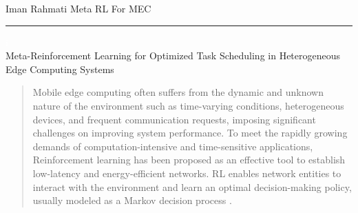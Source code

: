 \documentclass[12pt]{article}
\begin{document}
	

	
%




\begin{center} 
	
	
	\vspace{-17mm}
	
	\large Iman Rahmati  \hfill Meta RL For MEC \vspace{1mm} \hrule
	
	\vspace{-1mm}
	
	
	
	\textcolor{white}{i} \\ \LARGE Meta-Reinforcement Learning for Optimized Task Scheduling in Heterogeneous Edge Computing Systems \vspace{6mm}\\
	
\end{center}



\vspace{-8mm}

\begin{abstract}
	\vspace{-2mm}
	\noindent
	Mobile edge computing often suffers from the dynamic and unknown nature of the environment such as time-varying conditions, heterogeneous devices, and frequent communication requests, imposing significant challenges on improving system performance. To meet the rapidly growing demands of computation-intensive and time-sensitive applications, Reinforcement learning \cite{mnih2015human} has been proposed as an effective tool to establish low-latency and energy-efficient networks. RL enables network entities to interact with the environment and learn an optimal decision-making policy, usually modeled as a Markov decision process \cite{puterman2014markov}.
\end{abstract}



	
\vspace{4mm}
\end{document}
